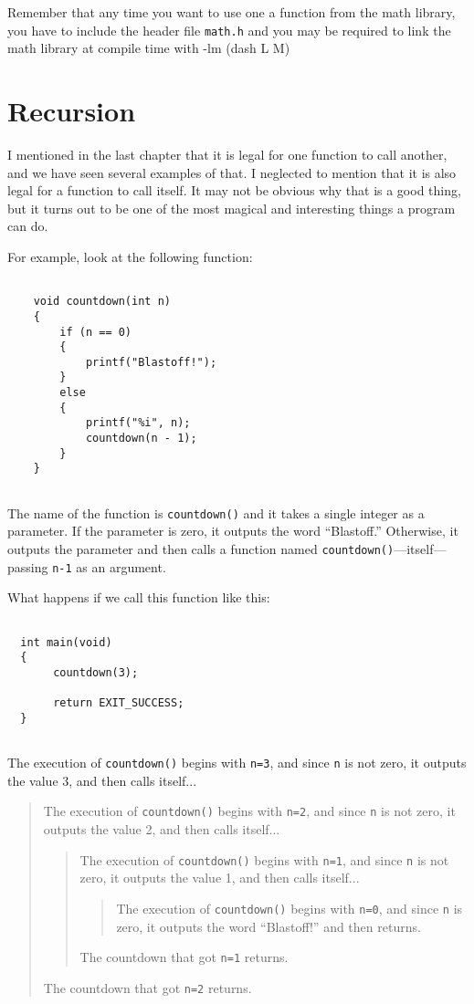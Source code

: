 Remember that any time you want to use one a function from the math
library, you have to include the header file {\tt math.h} and 
you may be required to link the math library at compile time with -lm (dash L M)

\section{Recursion}
\label{recursion}

I mentioned in the last chapter that it is legal for one function to
call another, and we have seen several examples of that.  I neglected
to mention that it is also legal for a function to call itself.  It
may not be obvious why that is a good thing, but it turns out to be
one of the most magical and interesting things a program can do.

For example, look at the following function:

\begin{verbatim}

    void countdown(int n) 
    {
        if (n == 0) 
        {
            printf("Blastoff!");
        }
        else
        {
            printf("%i", n);
            countdown(n - 1);
        }
    }
  
\end{verbatim}
%
The name of the function is {\tt countdown()} and it takes a single
integer as a parameter.  If the parameter is zero, it outputs
the word ``Blastoff.''  Otherwise, it outputs the parameter and
then calls a function named {\tt countdown()}---itself---passing
{\tt n-1} as an argument.

What happens if we call this function like this:

\begin{verbatim}

  int main(void)
  {
       countdown(3);
       
       return EXIT_SUCCESS;
  }
  
\end{verbatim}
%
The execution of {\tt countdown()} begins with {\tt n=3}, and
since {\tt n} is not zero, it outputs the value 3, and then
calls itself...

\begin{quote}
The execution of {\tt countdown()} begins with {\tt n=2}, and
since {\tt n} is not zero, it outputs the value 2, and then
calls itself...

\begin{quote}
The execution of {\tt countdown()} begins with {\tt n=1}, and
since {\tt n} is not zero, it outputs the value 1, and then
calls itself...

\begin{quote}
The execution of {\tt countdown()} begins with {\tt n=0}, and
since {\tt n} is zero, it outputs the word ``Blastoff!''
and then returns.
\end{quote}

The countdown that got {\tt n=1} returns.

\end{quote}

The countdown that got {\tt n=2} returns.

\end{quote}


